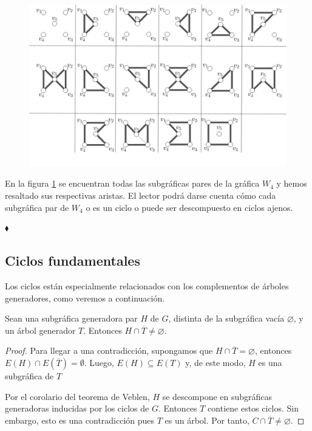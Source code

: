  \begin{ejem}
\begin{figure}[H]
\vspace{-0.55cm}
    \centering
    \includegraphics[scale=0.6]{img/imgchapter2/Espaciodeciclos.jpg}
    \caption{}
    \label{fig:espaciociclos}
\end{figure}
En la figura \ref{fig:espaciociclos} se encuentran todas las subgráficas pares de la gráfica $W_{4}$ y hemos resaltado sus respectivas aristas. El lector podrá darse cuenta cómo cada subgráfica par de $W_{4}$ o es un ciclo o puede ser descompuesto en ciclos ajenos.

\hfill $\blacklozenge$
\end{ejem}


\subsection{Ciclos fundamentales}
Los ciclos están especialmente relacionados con los complementos de árboles generadores, como veremos a continuación.

\begin{prop}
Sean una subgráfica generadora par $H$ de $G$, distinta de la subgráfica vacía $\varnothing$, y un árbol generador $T$. Entonces $H \cap \overline{T} \neq \varnothing$.
\end{prop}

\begin{proof}
Para llegar a una contradicción, supongamos que $H \cap \overline{T} = \varnothing$, entonces \\$E(H) \cap E(\overline{T}) = \emptyset$. Luego, $E(H) \subseteq E(T)$ y, de este modo, $H$ es una subgráfica de $T$

Por el corolario del teorema de Veblen, $H$ se descompone en subgráficas generadoras inducidas por los ciclos de $G$. Entonces $T$ contiene estos ciclos. Sin embargo, esto es una contradicción pues $T$ es un árbol. 
Por tanto, $C \cap \overline{T} \neq \varnothing$.

\end{proof}

